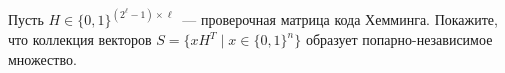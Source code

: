 Пусть $H \in \{0, 1\}^{(2^{\ell} - 1) \times  \ell}$~--- проверочная матрица кода Хемминга. Покажите, что коллекция векторов
$S = \{x H^T \mid x \in \{0, 1\}^n\}$ образует попарно-независимое множество.